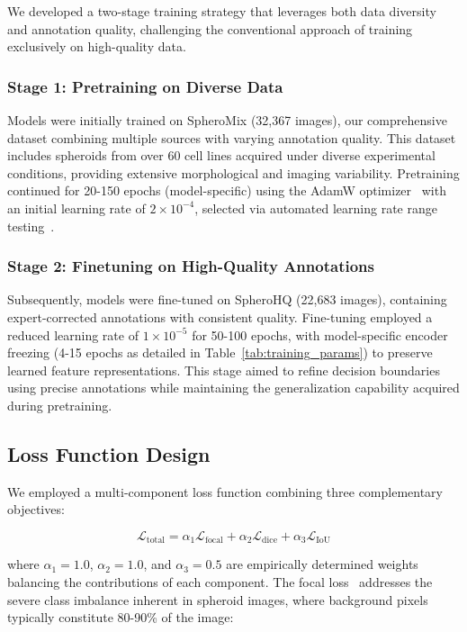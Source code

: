 \documentclass[preprint,12pt]{elsarticle}
\newcommand{\dsHQ}{SpheroHQ}
\newcommand{\dsMix}{SpheroMix}
\begin{document}
We developed a two-stage training strategy that leverages both data diversity and annotation quality, challenging the conventional approach of training exclusively on high-quality data.

\subsubsection{Stage 1: Pretraining on Diverse Data}
Models were initially trained on \dsMix{} (32,367 images), our comprehensive dataset combining multiple sources with varying annotation quality. This dataset includes spheroids from over 60 cell lines acquired under diverse experimental conditions, providing extensive morphological and imaging variability. Pretraining continued for 20-150 epochs (model-specific) using the AdamW optimizer~\cite{loshchilov2019decoupled} with an initial learning rate of $2 \times 10^{-4}$, selected via automated learning rate range testing~\cite{smith2017cyclical}.

\subsubsection{Stage 2: Finetuning on High-Quality Annotations}
Subsequently, models were fine-tuned on \dsHQ{} (22,683 images), containing expert-corrected annotations with consistent quality. Fine-tuning employed a reduced learning rate of $1 \times 10^{-5}$ for 50-100 epochs, with model-specific encoder freezing (4-15 epochs as detailed in Table~\ref{tab:training_params}) to preserve learned feature representations. This stage aimed to refine decision boundaries using precise annotations while maintaining the generalization capability acquired during pretraining.

\subsection{Loss Function Design}
\label{subsec:loss}

We employed a multi-component loss function combining three complementary objectives:

\begin{equation}
\mathcal{L}_{\text{total}} = \alpha_1 \mathcal{L}_{\text{focal}} + \alpha_2 \mathcal{L}_{\text{dice}} + \alpha_3 \mathcal{L}_{\text{IoU}}
\end{equation}

where $\alpha_1 = 1.0$, $\alpha_2 = 1.0$, and $\alpha_3 = 0.5$ are empirically determined weights balancing the contributions of each component. The focal loss~\cite{lin2017focal} addresses the severe class imbalance inherent in spheroid images, where background pixels typically constitute 80-90\% of the image:
\end{document}
